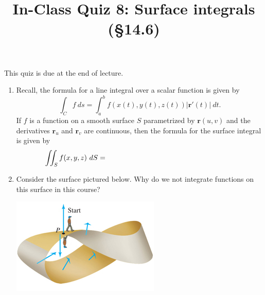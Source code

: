 \documentclass[]{article}
\title{\vspace{-3.5pc} 
	\flushleft \bf \Large In-Class Quiz 8: Surface integrals (\S 14.6)}
\date{}
\newcommand{\vect}[1]{\mathbf{#1}}
\begin{document}
\maketitle

\vspace{-3pc}
 This quiz is due at the end of lecture.  

\noindent\hrulefill

\begin{enumerate}

\item %
Recall, the formula for a line integral over a scalar function is given by 
\[
\int_Cf\ ds = \int_a^bf(x(t),y(t),z(t))|\vect r'(t)|\ dt.
\]
If $f$ is a function on a smooth surface $S$ parametrized by $\vect r(u,v)$ and the derivatives $\vect r_u$ and $\vect r_v$ are continuous, then the formula for the surface integral is given by
\[
\iint_Sf(x,y,z)\ dS = \hspace{15pc}
\]
\vspace{2pc}

\item %
Consider the surface pictured below.  Why do we not integrate functions on this surface in this course?

\begin{center}
\includegraphics[scale=1]{Mobius}
\end{center}

\end{enumerate}
\end{document}
